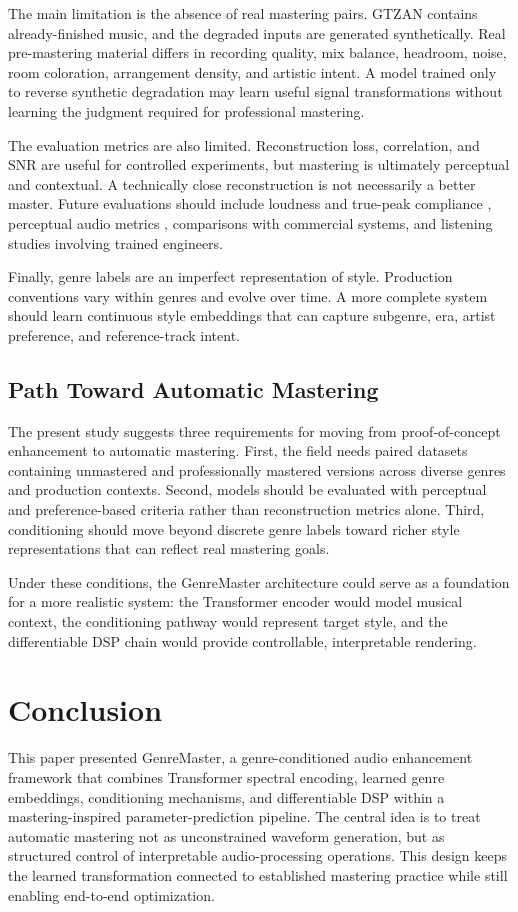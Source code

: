 \documentclass[journal]{IEEEtran}
\begin{document}
The main limitation is the absence of real mastering pairs. GTZAN contains already-finished music, and the degraded inputs are generated synthetically. Real pre-mastering material differs in recording quality, mix balance, headroom, noise, room coloration, arrangement density, and artistic intent. A model trained only to reverse synthetic degradation may learn useful signal transformations without learning the judgment required for professional mastering.

The evaluation metrics are also limited. Reconstruction loss, correlation, and SNR are useful for controlled experiments, but mastering is ultimately perceptual and contextual. A technically close reconstruction is not necessarily a better master. Future evaluations should include loudness and true-peak compliance \cite{itu2015loudness}, perceptual audio metrics \cite{kilgour2018fr,manocha2021cdpam}, comparisons with commercial systems, and listening studies involving trained engineers.

Finally, genre labels are an imperfect representation of style. Production conventions vary within genres and evolve over time. A more complete system should learn continuous style embeddings that can capture subgenre, era, artist preference, and reference-track intent.

\subsection{Path Toward Automatic Mastering}
The present study suggests three requirements for moving from proof-of-concept enhancement to automatic mastering. First, the field needs paired datasets containing unmastered and professionally mastered versions across diverse genres and production contexts. Second, models should be evaluated with perceptual and preference-based criteria rather than reconstruction metrics alone. Third, conditioning should move beyond discrete genre labels toward richer style representations that can reflect real mastering goals.

Under these conditions, the GenreMaster architecture could serve as a foundation for a more realistic system: the Transformer encoder would model musical context, the conditioning pathway would represent target style, and the differentiable DSP chain would provide controllable, interpretable rendering.

\section{Conclusion}
This paper presented GenreMaster, a genre-conditioned audio enhancement framework that combines Transformer spectral encoding, learned genre embeddings, conditioning mechanisms, and differentiable DSP within a mastering-inspired parameter-prediction pipeline. The central idea is to treat automatic mastering not as unconstrained waveform generation, but as structured control of interpretable audio-processing operations. This design keeps the learned transformation connected to established mastering practice while still enabling end-to-end optimization.
\end{document}

